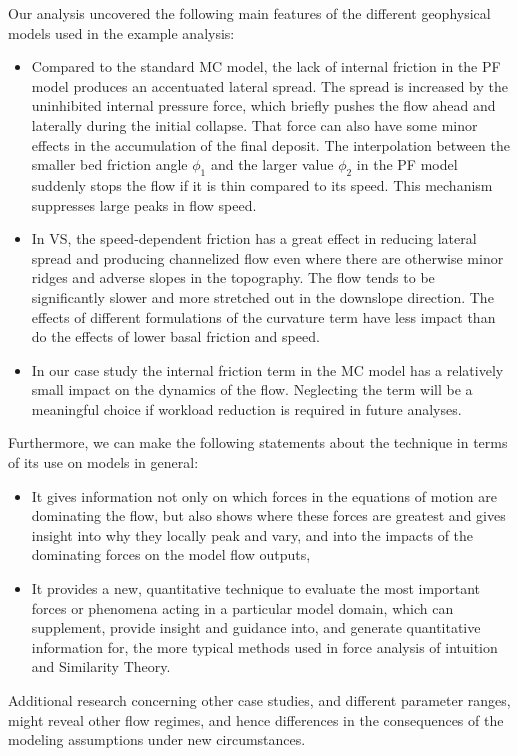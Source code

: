\documentclass{article}
\begin{document}
Our analysis uncovered the following main features of the different geophysical models used in the example analysis:
\begin{itemize}
  \item Compared to the standard MC model, the lack of internal friction in the PF model produces an accentuated lateral spread. The spread is increased by the uninhibited internal pressure force, which briefly pushes the flow ahead and laterally during the initial collapse. That force can also have some minor effects in the accumulation of the final deposit. The interpolation between the smaller bed friction angle $\phi_1$ and the larger value $\phi_2$ in the PF model suddenly stops the flow if it is thin compared to its speed. This mechanism suppresses large peaks in flow speed.
  \item In VS, the speed-dependent friction has a great effect in reducing lateral spread and producing channelized flow even where there are otherwise minor ridges and adverse slopes in the topography. The flow tends to be significantly slower and more stretched out in the downslope direction. The effects of different formulations of the curvature term have less impact than do the effects of lower basal friction and speed.
  \item In our case study the internal friction term in the MC model has a relatively small impact on the dynamics of the flow. Neglecting the term will be a meaningful choice if workload reduction is required in future analyses.
\end{itemize}

Furthermore, we can make the following statements about the technique in terms of its use on models in general:
\begin{itemize}
\item It gives information not only on which forces in the equations of motion are dominating the flow, but also shows where these forces are greatest and gives insight into why they locally peak and vary, and into the impacts of the dominating forces on the model flow outputs,
\item It provides a new, quantitative technique to evaluate the most important forces or phenomena acting in a particular model domain, which can supplement, provide insight and guidance into, and generate quantitative information for, the more typical methods used in force analysis of intuition and Similarity Theory.
\end{itemize}

Additional research concerning other case studies, and different parameter ranges, might reveal other flow regimes, and hence differences in the consequences of the modeling assumptions under new circumstances.
\end{document}
